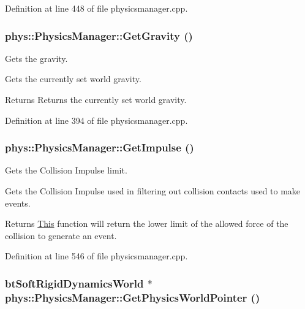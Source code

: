 Definition at line 448 of file physicsmanager.cpp.

\hypertarget{classphys_1_1PhysicsManager_a880950ca6093afd3267dcadf30934574}{
\subsubsection[{GetGravity}]{ phys::PhysicsManager::GetGravity ()}}
\label{d3/dcc/classphys_1_1PhysicsManager_a880950ca6093afd3267dcadf30934574}


Gets the gravity. 

Gets the currently set world gravity. \begin{DoxyReturn}{Returns}
Returns the currently set world gravity. 
\end{DoxyReturn}


Definition at line 394 of file physicsmanager.cpp.

\hypertarget{classphys_1_1PhysicsManager_ad11ee3904e1725f95ce9bd58f4ee3925}{
\subsubsection[{GetImpulse}]{ phys::PhysicsManager::GetImpulse ()}}
\label{d3/dcc/classphys_1_1PhysicsManager_ad11ee3904e1725f95ce9bd58f4ee3925}


Gets the Collision Impulse limit. 

Gets the Collision Impulse used in filtering out collision contacts used to make events. \begin{DoxyReturn}{Returns}
\hyperlink{structThis}{This} function will return the lower limit of the allowed force of the collision to generate an event. 
\end{DoxyReturn}


Definition at line 546 of file physicsmanager.cpp.

\hypertarget{classphys_1_1PhysicsManager_a4b4f8a23259a94a50c81649f39256d7f}{
\subsubsection[{GetPhysicsWorldPointer}]{\setlength{\rightskip}{0pt plus 5cm}btSoftRigidDynamicsWorld $\ast$ phys::PhysicsManager::GetPhysicsWorldPointer ()}}
\label{d3/dcc/classphys_1_1PhysicsManager_a4b4f8a23259a94a50c81649f39256d7f}


